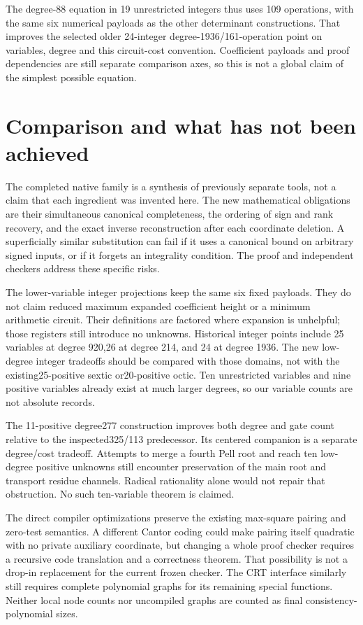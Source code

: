 \documentclass[11pt]{article}
\begin{document}
The degree-88 equation in 19 unrestricted integers thus uses 109 operations,
with the same six numerical payloads as the other determinant constructions.
That improves the selected older 24-integer degree-1936/161-operation point
on variables, degree and this circuit-cost convention. Coefficient payloads
and proof dependencies are still separate comparison axes, so this is not
a global claim of the simplest possible equation.




\section{Comparison and what has not been achieved}
The completed native family is a synthesis of previously separate tools,
not a claim that each ingredient was invented here. The new mathematical
obligations are their simultaneous canonical completeness, the ordering of
sign and rank recovery, and the exact inverse reconstruction after each
coordinate deletion. A superficially similar substitution can fail if it
uses a canonical bound on arbitrary signed inputs, or if it forgets an
integrality condition. The proof and independent checkers address these
specific risks.

The lower-variable integer projections keep the same six fixed payloads.
They do not claim reduced maximum expanded coefficient height or a minimum
arithmetic circuit. Their definitions are factored where expansion is
unhelpful; those registers still introduce no unknowns.
Historical integer points include 25 variables at degree 920,26 at degree 214,
and 24 at degree 1936. The new low-degree integer tradeoffs should be compared
with those domains, not with the existing25-positive sextic or20-positive
octic. Ten unrestricted variables and nine positive variables already exist
at much larger degrees, so our variable counts are not absolute records.

The 11-positive degree277 construction improves both degree and gate count
relative to the inspected325/113 predecessor. Its centered companion is a
separate degree/cost tradeoff. Attempts to merge a fourth Pell root and reach
ten low-degree positive unknowns still encounter preservation of the main
root and transport residue channels. Radical rationality alone would not
repair that obstruction. No such ten-variable theorem is claimed.

The direct compiler optimizations preserve the existing max-square pairing
and zero-test semantics. A different Cantor coding could make pairing itself
quadratic with no private auxiliary coordinate, but changing a whole proof
checker requires a recursive code translation and a correctness theorem.
That possibility is not a drop-in replacement for the current frozen
checker. The CRT interface similarly still requires complete polynomial
graphs for its remaining special functions. Neither local node counts nor
uncompiled graphs are counted as final consistency-polynomial sizes.
\end{document}
